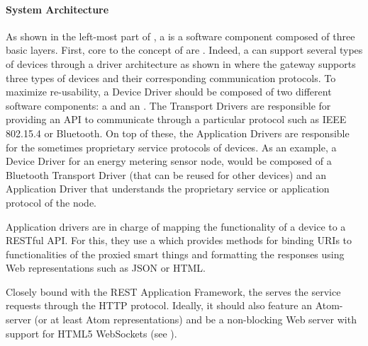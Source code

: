 \paragraph{System Architecture}
As shown in the left-most part of , a \sg{} is a software component composed of three basic layers. First, core to the concept of \sgs{} are . Indeed, a \st{} can support several types of devices through a driver architecture as shown in  where the gateway supports three types of devices and their corresponding communication protocols. To maximize re-usability, a Device Driver should be composed of two different software components: a  and an . The Transport Drivers are responsible for providing an API to communicate through a particular protocol such as IEEE 802.15.4 or Bluetooth. On top of these, the Application Drivers are responsible for the sometimes proprietary service protocols of devices. As an example, a Device Driver for an energy metering sensor node, would be composed of a Bluetooth Transport Driver (that can be reused for other devices) and an Application Driver that understands the proprietary service or application protocol of the node.

Application drivers are in charge of mapping the functionality of a device to a RESTful API. For this, they use a  which provides methods for binding URIs to functionalities of the proxied smart things and formatting the responses using Web representations such as JSON or HTML.  

Closely bound with the REST Application Framework, the  serves the service requests through the HTTP protocol. Ideally, it should also feature an Atom-server (or at least Atom representations) and be a non-blocking Web server with support for HTML5 WebSockets (see ).

